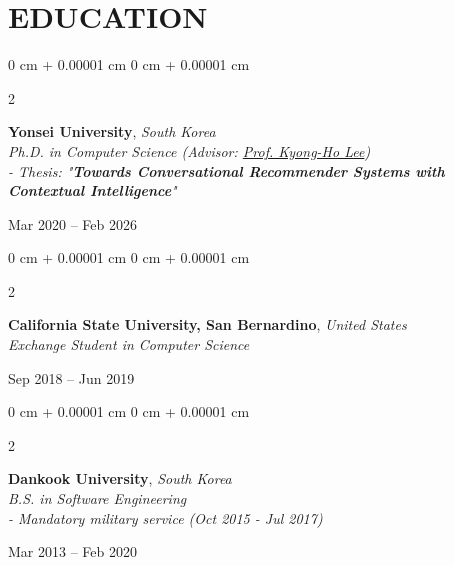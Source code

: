 \documentclass[10pt, letterpaper]{article}
\newenvironment{highlights}{
	\begin{itemize}[
		topsep=0.10 cm,
		parsep=0.10 cm,
		partopsep=0pt,
		itemsep=0pt,
		leftmargin=0 cm + 10pt
		]
	}{
	\end{itemize}
} %
\newenvironment{onecolentry}{
	\begin{adjustwidth}{
			0 cm + 0.00001 cm
		}{
			0 cm + 0.00001 cm
		}
	}{
	\end{adjustwidth}
} %
\newenvironment{twocolentry}[2][]{
	\onecolentry
	\def\secondColumn{#2}
	\setcolumnwidth{\fill, 4.5 cm}
	\begin{paracol}{2}
	}{
		\switchcolumn \raggedleft \secondColumn
	\end{paracol}
	\endonecolentry
} %
\let\hrefWithoutArrow\href
\begin{document}
	\section{EDUCATION}		
		\begin{twocolentry}{
				Mar 2020 – Feb 2026
			}
			\textbf{Yonsei University}, \textit{South Korea}  \\
			\textit{Ph.D. in Computer Science (Advisor: \hrefWithoutArrow{https://icl.yonsei.ac.kr/member-prof.html}{Prof. Kyong-Ho Lee}) } \\
			\textit{ \small{- Thesis: "\textbf{Towards Conversational Recommender Systems with Contextual Intelligence}"}}
		\end{twocolentry}
		\vspace{0.10 cm}
			
		\begin{twocolentry}{
				Sep 2018 – Jun 2019
			}
			\textbf{California State University, San Bernardino}, \textit{United States}  \\
			\textit{Exchange Student in Computer Science} 
		\end{twocolentry}	
		\vspace{0.10 cm}
		
		\begin{twocolentry}{
				Mar 2013 – Feb 2020
			}
			\textbf{Dankook University}, \textit{South Korea}  \\
			\textit{B.S. in Software Engineering}\\
			\textit{ \footnotesize{- Mandatory military service (Oct 2015 - Jul 2017)}}
		\end{twocolentry}
		

		\vspace{0.2 cm}	
\end{document}
